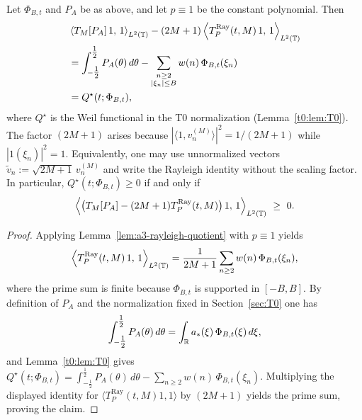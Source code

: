 \begin{theorem}\label{thm:a3-rayleigh-identification}
Let $\Phi_{B,t}$ and $P_A$ be as above, and let $p\equiv1$ be the constant polynomial.
Then
\[
\begin{aligned}
  &\left\langle T_M[P_A]\,1,\,1\right\rangle_{L^2(\mathbb T)}
  - (2M+1)\left\langle T_P^{\mathrm{Ray}}(t,M)\,1,\,1\right\rangle_{L^2(\mathbb T)} \\
  &= \int_{-\tfrac12}^{\tfrac12} P_A(\theta)\,d\theta
     - \sum_{\substack{n\ge2\\ |\xi_n|\le B}} w(n)\,\Phi_{B,t}(\xi_n) \\
  &= Q^\star(t;\Phi_{B,t}),
\end{aligned}
\]
where $Q^\star$ is the Weil functional in the T0 normalization (Lemma~\ref{t0:lem:T0}).  The factor
$(2M{+}1)$ arises because $|\langle 1,v_n^{(M)}\rangle|^2 = 1/(2M{+}1)$ while
$|1(\xi_n)|^2 = 1$.  Equivalently, one may use unnormalized vectors
$\tilde v_n := \sqrt{2M{+}1}\,v_n^{(M)}$ and write the Rayleigh identity without the scaling
factor.  In particular, $Q^\star(t;\Phi_{B,t})\ge0$ if and only if
\[
  \left\langle \bigl(T_M[P_A]-(2M+1)T_P^{\mathrm{Ray}}(t,M)\bigr)\,1,\,1\right\rangle_{L^2(\TT)}\ \ge\ 0.
\]
\end{theorem}

\begin{proof}
Applying Lemma~\ref{lem:a3-rayleigh-quotient} with $p\equiv1$ yields
\[
  \left\langle T_P^{\mathrm{Ray}}(t,M)\,1,\,1\right\rangle_{L^2(\mathbb T)}
  = \frac{1}{2M+1}\sum_{n\ge2} w(n)\,\Phi_{B,t}(\xi_n),
\]
where the prime sum is finite because $\Phi_{B,t}$ is supported in $[-B,B]$.
By definition of $P_A$ and the normalization fixed in Section~\ref{sec:T0} one has
\[
  \int_{-\tfrac12}^{\tfrac12} P_A(\theta)\,d\theta
  = \int_{\mathbb R} a_*(\xi)\,\Phi_{B,t}(\xi)\,d\xi,
\]
and Lemma~\ref{t0:lem:T0} gives
$Q^\star(t;\Phi_{B,t}) = \int_{-\tfrac12}^{\tfrac12}P_A(\theta)\,d\theta
       - \sum_{n\ge2}w(n)\,\Phi_{B,t}(\xi_n)$.
Multiplying the displayed identity for $\langle T_P^{\mathrm{Ray}}(t,M)1,1\rangle$ by $(2M+1)$ yields
the prime sum, proving the claim.
\end{proof}
